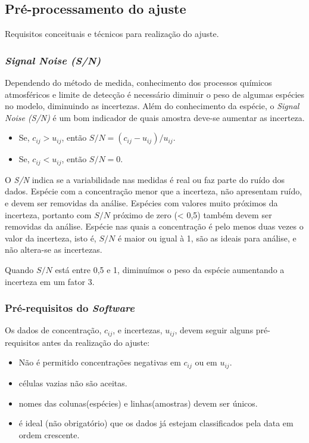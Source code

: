 \subsection{Pré-processamento do ajuste}
Requisitos conceituais e técnicos para realização do ajuste.

\subsubsection{\textit{Signal Noise (S/N)}}
Dependendo do método de medida, conhecimento dos processos químicos 
atmosféricos e limite de detecção é necessário diminuir o peso de algumas 
espécies no modelo, diminuindo as incertezas. 
Além do conhecimento da espécie, o \textit{Signal Noise (S/N)} é um bom 
indicador de quais amostra deve-se aumentar as incerteza.

\begin{itemize}
  \item Se, $c_{ij} >  u_{ij}$, então $ S/N = (c_{ij} - u_{ij})/u_{ij}$.
  \item Se, $c_{ij} <  u_{ij}$, então $S/N = 0 $.
\end{itemize}

O \textit{S/N} indica se a variabilidade nas medidas é real ou faz parte do 
ruído dos dados. 
Espécie com a concentração menor que a incerteza, não apresentam ruído, e devem 
ser removidas da análise. Espécies com valores muito próximos da incerteza, 
portanto com $S/N$ próximo de zero (< 0,5) também devem ser removidas da 
análise. 
Espécie nas quais a concentração é pelo menos duas vezes o valor da incerteza, 
isto é, $S/N$ é maior ou igual à 1, são as ideais para análise, 
e não altera-se as incertezas. 

Quando $S/N$ está entre 0,5 e 1, diminuímos o peso da espécie aumentando a 
incerteza em um fator 3.  

\subsubsection{Pré-requisitos do \textit{Software}}

Os dados de concentração, $c_{ij}$, e incertezas, $u_{ij}$, devem seguir 
alguns pré-requisitos antes da realização do ajuste:

\begin{itemize}
  \item Não é permitido concentrações negativas em $c_{ij}$ ou em $u_{ij}$.
  \item células vazias não são aceitas.
  \item nomes das colunas(espécies) e linhas(amostras) devem ser únicos.
  \item é ideal (não obrigatório) que os dados já estejam classificados 
        pela data em ordem crescente.
\end{itemize}

